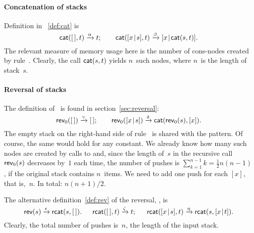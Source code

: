 \paragraph{Concatenation of stacks}

Definition in \fig~\vref{def:cat} is
\begin{equation*}
\textsf{cat}(        [\,],t) \xrightarrow{\smash{\alpha}} t;\qquad
\textsf{cat}([{x}\!\mid\!{s}],t) \xrightarrow{\smash{\beta}}
                                 [{x}\!\mid\!{\textsf{cat}(s,t)}].
\end{equation*}
The relevant measure of memory usage here is the number of cons\hyp{}nodes created by rule~\clause{\beta}. Clearly, the call \(\textsf{cat}(s,t)\) yields \(n\)~such nodes, where \(n\)~is the length of stack~\(s\).

\paragraph{Reversal of stacks}

The definition of~ is found in
section~\ref{sec:reversal}:
\begin{equation*}
\textsf{rev}_0([\,]) \xrightarrow{\smash{\gamma}} [\,];\qquad
\textsf{rev}_0([{x}\!\mid\!{s}]) \xrightarrow{\smash{\delta}}
                         \textsf{cat}(\textsf{rev}_0(s),[x]).
\end{equation*}
The empty stack on the right\hyp{}hand side of rule~\clause{\gamma} is
shared with the pattern. Of course, the same would hold for any
constant. We already know how many such nodes are created by calls to
 and, since the length of~\(s\) in the recursive call
\(\textsf{rev}_0(s)\) decreases by~\(1\) each time, the number of pushes
is \(\sum_{k=1}^{n-1}k = \tfrac{1}{2}n(n-1)\), if the original stack
contains \(n\)~items. We need to add one push for each \([x]\), that
is,~\(n\). In total: \(n(n+1)/2\).

The alternative definition~\eqref{def:rev} of the reversal,
, is
\begin{equation*}
\textsf{rev}(s) \xrightarrow{\smash{\epsilon}} \textsf{rcat}(s,[\,]).\quad\;\;
\textsf{rcat}([\,],t) \xrightarrow{\smash{\zeta}} t;\quad\;\;
\textsf{rcat}([{x}\!\mid\!{s}],t) \xrightarrow{\smash{\eta}}
                          \textsf{rcat}(s,[{x}\!\mid\!{t}]).
\end{equation*}
Clearly, the total number of pushes is~\(n\), the length of the input
stack.


